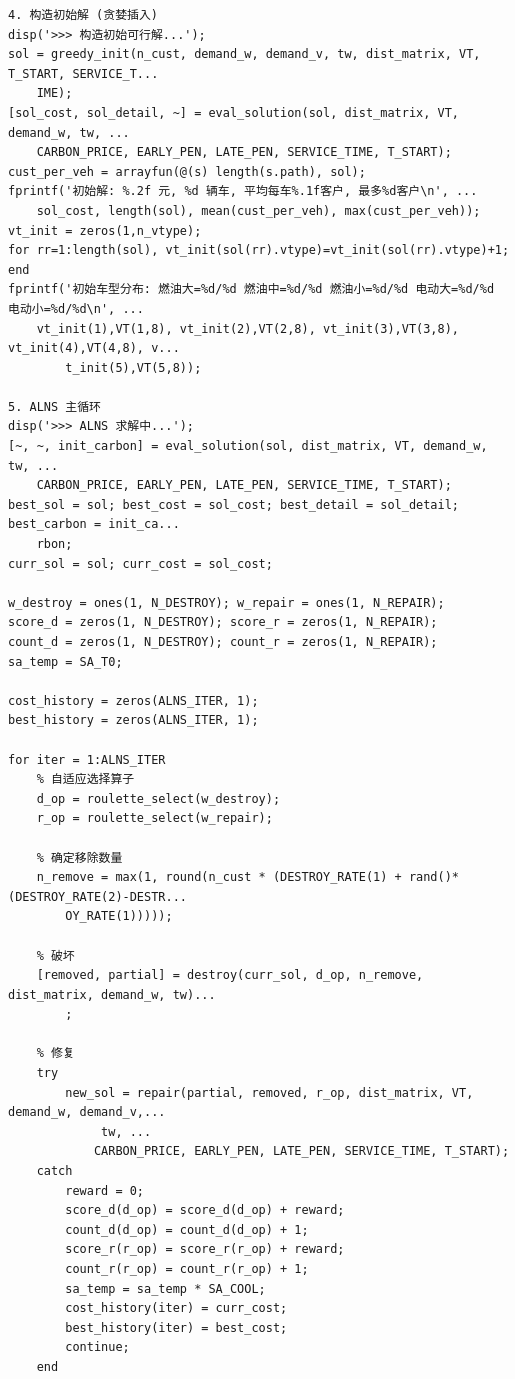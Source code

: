 {\begin{verbatim}
4. 构造初始解 (贪婪插入)
disp('>>> 构造初始可行解...');
sol = greedy_init(n_cust, demand_w, demand_v, tw, dist_matrix, VT, T_START, SERVICE_T...
    IME);
[sol_cost, sol_detail, ~] = eval_solution(sol, dist_matrix, VT, demand_w, tw, ...
    CARBON_PRICE, EARLY_PEN, LATE_PEN, SERVICE_TIME, T_START);
cust_per_veh = arrayfun(@(s) length(s.path), sol);
fprintf('初始解: %.2f 元, %d 辆车, 平均每车%.1f客户, 最多%d客户\n', ...
    sol_cost, length(sol), mean(cust_per_veh), max(cust_per_veh));
vt_init = zeros(1,n_vtype);
for rr=1:length(sol), vt_init(sol(rr).vtype)=vt_init(sol(rr).vtype)+1; end
fprintf('初始车型分布: 燃油大=%d/%d 燃油中=%d/%d 燃油小=%d/%d 电动大=%d/%d 电动小=%d/%d\n', ...
    vt_init(1),VT(1,8), vt_init(2),VT(2,8), vt_init(3),VT(3,8), vt_init(4),VT(4,8), v...
        t_init(5),VT(5,8));

5. ALNS 主循环
disp('>>> ALNS 求解中...');
[~, ~, init_carbon] = eval_solution(sol, dist_matrix, VT, demand_w, tw, ...
    CARBON_PRICE, EARLY_PEN, LATE_PEN, SERVICE_TIME, T_START);
best_sol = sol; best_cost = sol_cost; best_detail = sol_detail; best_carbon = init_ca...
    rbon;
curr_sol = sol; curr_cost = sol_cost;

w_destroy = ones(1, N_DESTROY); w_repair = ones(1, N_REPAIR);
score_d = zeros(1, N_DESTROY); score_r = zeros(1, N_REPAIR);
count_d = zeros(1, N_DESTROY); count_r = zeros(1, N_REPAIR);
sa_temp = SA_T0;

cost_history = zeros(ALNS_ITER, 1);
best_history = zeros(ALNS_ITER, 1);

for iter = 1:ALNS_ITER
    % 自适应选择算子
    d_op = roulette_select(w_destroy);
    r_op = roulette_select(w_repair);

    % 确定移除数量
    n_remove = max(1, round(n_cust * (DESTROY_RATE(1) + rand()*(DESTROY_RATE(2)-DESTR...
        OY_RATE(1)))));

    % 破坏
    [removed, partial] = destroy(curr_sol, d_op, n_remove, dist_matrix, demand_w, tw)...
        ;

    % 修复
    try
        new_sol = repair(partial, removed, r_op, dist_matrix, VT, demand_w, demand_v,...
             tw, ...
            CARBON_PRICE, EARLY_PEN, LATE_PEN, SERVICE_TIME, T_START);
    catch
        reward = 0;
        score_d(d_op) = score_d(d_op) + reward;
        count_d(d_op) = count_d(d_op) + 1;
        score_r(r_op) = score_r(r_op) + reward;
        count_r(r_op) = count_r(r_op) + 1;
        sa_temp = sa_temp * SA_COOL;
        cost_history(iter) = curr_cost;
        best_history(iter) = best_cost;
        continue;
    end


\end{verbatim}}
